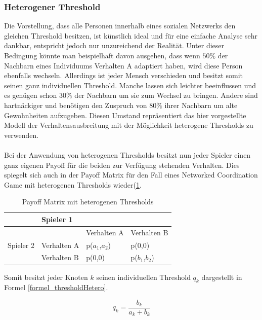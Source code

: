 \documentclass[12pt]{article}
\begin{document}
\subsubsection{Heterogener Threshold}
Die Vorstellung, dass alle Personen innerhalb eines sozialen Netzwerks den gleichen Threshold besitzen, ist künstlich ideal und für eine einfache Analyse sehr dankbar, entspricht jedoch nur unzureichend der Realität. Unter dieser Bedingung könnte man beispielhaft davon ausgehen, dass wenn $50\%$ der Nachbarn eines Individuums Verhalten A adaptiert haben, wird diese Person ebenfalls wechseln. Allerdings ist jeder Mensch verschieden und besitzt somit seinen ganz individuellen Threshold. Manche lassen sich leichter beeinflussen und es genügen schon $30\%$ der Nachbarn um sie zum Wechsel zu bringen. Andere sind hartnäckiger und benötigen den Zuspruch von $80\%$ ihrer Nachbarn um alte Gewohnheiten aufzugeben. Diesen Umstand repräsentiert das hier vorgestellte Modell der Verhaltensausbreitung mit der Möglichkeit heterogene Thresholds zu verwenden.\\\\
Bei der Anwendung von heterogenen Thresholds besitzt nun jeder Spieler einen ganz eigenen Payoff für die beiden zur Verfügung stehenden Verhalten. Dies spiegelt sich auch in der Payoff Matrix für den Fall eines Networked Coordination Game mit heterogenen Thresholds wieder(\ref{table_payofHetero}.

\begin{table}[h]
\centering
\caption{Payoff Matrix mit heterogenen Thresholds}
\label{table_payofHetero}
\begin{tabular}{|l|l|l|l|}
\hline
                           & \multicolumn{3}{l|}{Spieler 1}           \\ \hline
\multirow{3}{*}{Spieler 2} &             & Verhalten A  & Verhalten B \\ \cline{2-4} 
                           & Verhalten A & p($a_1$,$a_2$) & p(0,0)      \\ \cline{2-4} 
                           & Verhalten B & p(0,0)       & p($b_1$,$b_2$)      \\ \hline
\end{tabular}
\end{table}
Somit besitzt jeder Knoten $k$ seinen individuellen Threshold $q_k$ dargestellt in Formel \ref{formel_thresholdHetero}.

%
  \begin{equation}
 \label{formel_thresholdHetero}
 q_k =  \frac{b_k}{a_k+b_k}
 \end{equation}
 
\end{document}
